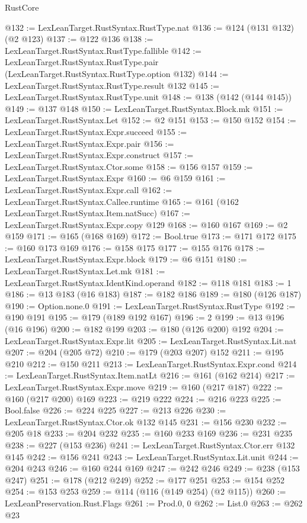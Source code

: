 \begin{lexlean}{RustCore}
\begin{coremodule}
@132 := LexLeanTarget.RustSyntax.RustType.nat
@136 := @124 (@131 @132) (@2 @123)
@137 := @122 @136
@138 := LexLeanTarget.RustSyntax.RustType.fallible
@142 := LexLeanTarget.RustSyntax.RustType.pair (LexLeanTarget.RustSyntax.RustType.option @132)
@144 := LexLeanTarget.RustSyntax.RustType.result @132
@145 := LexLeanTarget.RustSyntax.RustType.unit
@148 := @138 (@142 (@144 @145))
@149 := @137 @148
@150 := LexLeanTarget.RustSyntax.Block.mk
@151 := LexLeanTarget.RustSyntax.Let
@152 := @2 @151
@153 := @150 @152
@154 := LexLeanTarget.RustSyntax.Expr.succeed
@155 := LexLeanTarget.RustSyntax.Expr.pair
@156 := LexLeanTarget.RustSyntax.Expr.construct
@157 := LexLeanTarget.RustSyntax.Ctor.some
@158 := @156 @157
@159 := LexLeanTarget.RustSyntax.Expr
@160 := @6 @159
@161 := LexLeanTarget.RustSyntax.Expr.call
@162 := LexLeanTarget.RustSyntax.Callee.runtime
@165 := @161 (@162 LexLeanTarget.RustSyntax.Item.natSucc)
@167 := LexLeanTarget.RustSyntax.Expr.copy @129
@168 := @160 @167
@169 := @2 @159
@171 := @165 (@168 @169)
@172 := Bool.true
@173 := @171 @172
@175 := @160 @173 @169
@176 := @158 @175
@177 := @155 @176
@178 := LexLeanTarget.RustSyntax.Expr.block
@179 := @6 @151
@180 := LexLeanTarget.RustSyntax.Let.mk
@181 := LexLeanTarget.RustSyntax.IdentKind.operand
@182 := @118 @181
@183 := 1
@186 := @13 @183 (@16 @183)
@187 := @182 @186
@189 := @180 (@126 @187)
@190 := Option.none.{0}
@191 := LexLeanTarget.RustSyntax.RustType
@192 := @190 @191
@195 := @179 (@189 @192 @167)
@196 := 2
@199 := @13 @196 (@16 @196)
@200 := @182 @199
@203 := @180 (@126 @200) @192
@204 := LexLeanTarget.RustSyntax.Expr.lit
@205 := LexLeanTarget.RustSyntax.Lit.nat
@207 := @204 (@205 @72)
@210 := @179 (@203 @207) @152
@211 := @195 @210
@212 := @150 @211
@213 := LexLeanTarget.RustSyntax.Expr.cond
@214 := LexLeanTarget.RustSyntax.Item.natLt
@216 := @161 (@162 @214)
@217 := LexLeanTarget.RustSyntax.Expr.move
@219 := @160 (@217 @187)
@222 := @160 (@217 @200) @169
@223 := @219 @222
@224 := @216 @223
@225 := Bool.false
@226 := @224 @225
@227 := @213 @226
@230 := LexLeanTarget.RustSyntax.Ctor.ok @132 @145
@231 := @156 @230
@232 := @205 @18
@233 := @204 @232
@235 := @160 @233 @169
@236 := @231 @235
@238 := @227 (@153 @236)
@241 := LexLeanTarget.RustSyntax.Ctor.err @132 @145
@242 := @156 @241
@243 := LexLeanTarget.RustSyntax.Lit.unit
@244 := @204 @243
@246 := @160 @244 @169
@247 := @242 @246
@249 := @238 (@153 @247)
@251 := @178 (@212 @249)
@252 := @177 @251
@253 := @154 @252
@254 := @153 @253
@259 := @114 (@116 (@149 @254) (@2 @115))
@260 := LexLeanPreservation.Rust.Flags
@261 := Prod.{0, 0}
@262 := List.{0}
@263 := @262 @23

\end{coremodule}
\end{lexlean}
